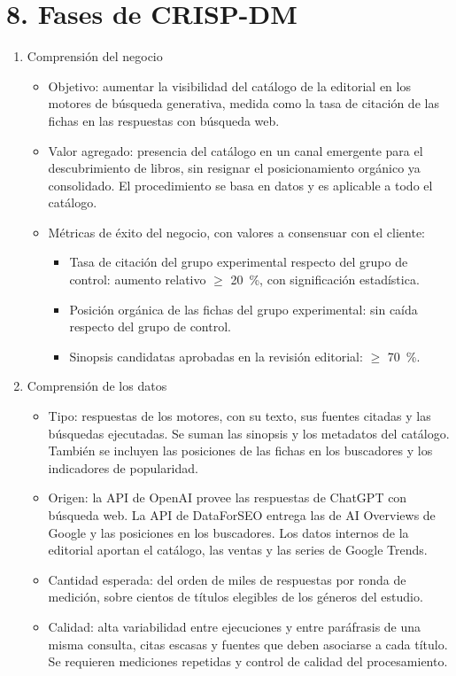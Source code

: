 \documentclass[
11pt, %
codirector, %
]{charter}
\begin{document}
\section{8. Fases de CRISP-DM}
\label{sec:crispdm}

\begin{enumerate}
	\item Comprensión del negocio
	\begin{itemize}
		\item Objetivo: aumentar la visibilidad del catálogo de la editorial en los motores de búsqueda generativa, medida como la tasa de citación de las fichas en las respuestas con búsqueda web.
		\item Valor agregado: presencia del catálogo en un canal emergente para el descubrimiento de libros, sin resignar el posicionamiento orgánico ya consolidado. El procedimiento se basa en datos y es aplicable a todo el catálogo.
		\item Métricas de éxito del negocio, con valores a consensuar con el cliente:
		\begin{itemize}
			\item Tasa de citación del grupo experimental respecto del grupo de control: aumento relativo $\geq$ 20~\%, con significación estadística.
			\item Posición orgánica de las fichas del grupo experimental: sin caída respecto del grupo de control.
			\item Sinopsis candidatas aprobadas en la revisión editorial: $\geq$ 70~\%.
		\end{itemize}
	\end{itemize}

	\item Comprensión de los datos
	\begin{itemize}
		\item Tipo: respuestas de los motores, con su texto, sus fuentes citadas y las búsquedas ejecutadas. Se suman las sinopsis y los metadatos del catálogo. También se incluyen las posiciones de las fichas en los buscadores y los indicadores de popularidad.
		\item Origen: la API de OpenAI provee las respuestas de ChatGPT con búsqueda web. La API de DataForSEO entrega las de AI Overviews de Google y las posiciones en los buscadores. Los datos internos de la editorial aportan el catálogo, las ventas y las series de Google Trends.
		\item Cantidad esperada: del orden de miles de respuestas por ronda de medición, sobre cientos de títulos elegibles de los géneros del estudio.
		\item Calidad: alta variabilidad entre ejecuciones y entre paráfrasis de una misma consulta, citas escasas y fuentes que deben asociarse a cada título. Se requieren mediciones repetidas y control de calidad del procesamiento.
	\end{itemize}


\end{enumerate}
\end{document}
